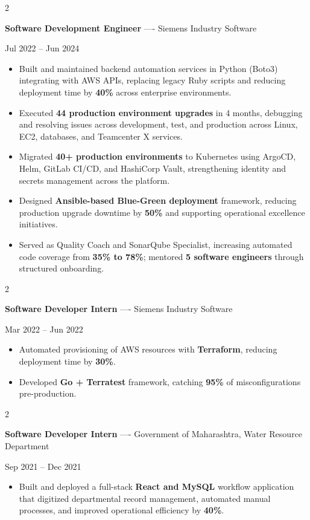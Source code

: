 \documentclass[10pt, letterpaper]{article}
\newenvironment{highlights}{
    \begin{itemize}[
        topsep=0.10 cm,
        parsep=0.06 cm,
        partopsep=0pt,
        itemsep=0.06 cm,
        leftmargin=12pt
    ]
}{
    \end{itemize}
}
\newenvironment{twocolentry}[2][]{
    \onecolentry
    \def\secondColumn{#2}
    \setcolumnwidth{\fill, 4.5 cm}
    \begin{paracol}{2}
}{
    \switchcolumn \raggedleft \secondColumn
    \end{paracol}
    \endonecolentry
}
\begin{document}
\vspace{0.15 cm}

\begin{twocolentry}{Jul 2022 -- Jun 2024}
\textbf{Software Development Engineer} ---- Siemens Industry Software
\end{twocolentry}
\begin{highlights}
  \item Built and maintained backend automation services in Python (Boto3) integrating with AWS APIs, replacing legacy Ruby scripts and reducing deployment time by \textbf{40\%} across enterprise environments.
  \item Executed \textbf{44 production environment upgrades} in 4 months, debugging and resolving issues across development, test, and production across Linux, EC2, databases, and Teamcenter X services.
  \item Migrated \textbf{40+ production environments} to Kubernetes using ArgoCD, Helm, GitLab CI/CD, and HashiCorp Vault, strengthening identity and secrets management across the platform.
  \item Designed \textbf{Ansible-based Blue-Green deployment} framework, reducing production upgrade downtime by \textbf{50\%} and supporting operational excellence initiatives.
  \item Served as Quality Coach and SonarQube Specialist, increasing automated code coverage from \textbf{35\% to 78\%}; mentored \textbf{5 software engineers} through structured onboarding.
\end{highlights}

\vspace{0.15 cm}

\begin{twocolentry}{Mar 2022 -- Jun 2022}
\textbf{Software Developer Intern} ---- Siemens Industry Software
\end{twocolentry}
\begin{highlights}
  \item Automated provisioning of AWS resources with \textbf{Terraform}, reducing deployment time by \textbf{30\%}.
  \item Developed \textbf{Go + Terratest} framework, catching \textbf{95\%} of misconfigurations pre-production.
\end{highlights}

\vspace{0.15 cm}

\begin{twocolentry}{Sep 2021 -- Dec 2021}
\textbf{Software Developer Intern} ---- Government of Maharashtra, Water Resource Department
\end{twocolentry}
\begin{highlights}
  \item Built and deployed a full-stack \textbf{React and MySQL} workflow application that digitized departmental record management, automated manual processes, and improved operational efficiency by \textbf{40\%}.
\end{highlights}
\end{document}
